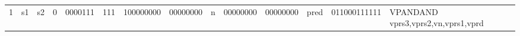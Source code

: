 \begin{landscape}
\begin{table}[p]
\begin{small}
\begin{center}
\begin{tabular}{p{0.08in}@{}p{0.08in}@{}p{0.08in}@{}p{0.08in}@{}p{0.50in}@{}p{0.30in}@{}p{0.08in}@{}p{0.8in}@{}p{0.48in}@{}p{0.32in}@{}p{0.08in}@{}p{0.8in}@{}p{0.8in}@{}p{0.4in}@{}p{0.56in}l}
\multicolumn{1}{|c|}{1} &
\multicolumn{1}{c|}{s1} &
\multicolumn{1}{c|}{s2} &
\multicolumn{1}{c|}{0} &
\multicolumn{1}{c|}{0000111} &
\multicolumn{1}{c|}{111} &
\multicolumn{2}{c|}{100000000} &
\multicolumn{2}{c|}{00000000} &
\multicolumn{1}{c|}{n} &
\multicolumn{1}{c|}{00000000} &
\multicolumn{1}{c|}{00000000} &
\multicolumn{1}{c|}{pred} &
\multicolumn{1}{c|}{011000111111} & VPANDAND vprs3,vprs2,vn,vprs1,vprd \\
\cline{1-15}
  

\end{tabular}
\end{center}
\end{small}

\label{instr-table}
\end{table}
\end{landscape}
\restoregeometry
  

\newpage

